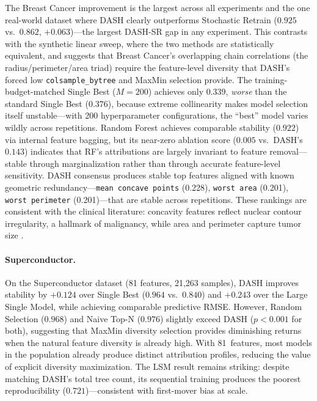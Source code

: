 \documentclass[11pt]{article}
\newcommand{\dash}{\textsc{DASH}}
\begin{document}
The Breast Cancer improvement is the largest across all experiments and
the one real-world dataset where \dash{} clearly outperforms Stochastic
Retrain ($0.925$ vs.\ $0.862$, $+0.063$)---the largest \dash{}-SR gap
in any experiment. This contrasts with the synthetic linear sweep, where
the two methods are statistically equivalent, and suggests that Breast
Cancer's overlapping chain correlations (the radius/perimeter/area triad)
require the feature-level diversity that \dash{}'s forced low
\texttt{colsample\_bytree} and MaxMin selection provide.
The training-budget-matched Single Best ($M{=}200$) achieves only $0.339$,
\emph{worse} than the standard Single Best ($0.376$), because extreme
collinearity makes model selection itself unstable---with 200
hyperparameter configurations, the ``best'' model varies wildly across
repetitions. Random Forest achieves comparable stability ($0.922$) via
internal feature bagging, but its near-zero ablation score ($0.005$
vs.\ \dash{}'s $0.143$) indicates that RF's attributions are largely
invariant to feature removal---stable through marginalization rather than
through accurate feature-level sensitivity. \dash{} consensus produces
stable top features aligned with known geometric
redundancy---\texttt{mean concave points} (0.228), \texttt{worst area}
(0.201), \texttt{worst perimeter} (0.201)---that are stable across
repetitions.  These rankings are consistent with the clinical literature:
concavity features reflect nuclear contour irregularity, a hallmark of
malignancy, while area and perimeter capture tumor size
\citep{street1993nuclear}.

\paragraph{Superconductor.}
On the Superconductor dataset (81 features, 21,263 samples), \dash{}
improves stability by $+0.124$ over Single Best ($0.964$ vs.\ $0.840$)
and $+0.243$ over the Large Single Model, while achieving comparable
predictive RMSE. However, Random Selection ($0.968$) and Naive Top-N
($0.976$) slightly exceed \dash{} ($p < 0.001$ for both), suggesting
that MaxMin diversity selection provides diminishing returns when the
natural feature diversity is already high. With 81~features, most models
in the population already produce distinct attribution profiles, reducing
the value of explicit diversity maximization.
The LSM result remains striking: despite matching \dash{}'s total tree count,
its sequential training produces the poorest reproducibility ($0.721$)---consistent
with first-mover bias at scale.
\end{document}
